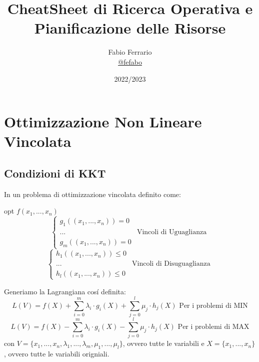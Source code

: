 \documentclass[12pt, a4paper, openany]{book}
\begin{document}
\title{CheatSheet di Ricerca Operativa e Pianificazione delle Risorse}

\author{
	Fabio Ferrario\\
	\small{\href{https://t.me/fefabo}{@fefabo}}
}
\date{2022/2023}

\maketitle

\tableofcontents

\chapter{Ottimizzazione Non Lineare Vincolata}
\section{Condizioni di KKT}
In un problema di ottimizzazione vincolata definito come:
\begin{center}
    opt $f(x_1,...,x_n)$
    \\
    \[
      \begin{cases}
        g_1((x_1,...,x_n)) = 0\\
        ... & \text{Vincoli di Uguaglianza}\\
        g_m((x_1,...,x_n)) = 0
      \end{cases}  
    \]
    \[
      \begin{cases}
        h_1((x_1,...,x_n)) \leq 0\\
        ... & \text{Vincoli di Disuguaglianza}\\
        h_l((x_1,...,x_n)) \leq 0
      \end{cases}  
    \]
\end{center}
Generiamo la Lagrangiana cosí definita:
\[
    L(V) = f(X) + \sum_{i=0}^{m} \lambda_i \cdot g_i(X) + \sum_{j=0}^{l} \mu_j \cdot h_j(X) \text{ Per i problemi di MIN}
\]
\[
    L(V) = f(X) - \sum_{i=0}^{m} \lambda_i \cdot g_i(X) - \sum_{j=0}^{l} \mu_j \cdot h_j(X) \text{ Per i problemi di MAX}
\]
con $V=\{x_1,...,x_n,\lambda_1,...,\lambda_m, \mu_1,...,\mu_l\}$, ovvero tutte le variabili e $X=\{x_1,...,x_n\}$, ovvero tutte le variabili origniali.
\end{document}
